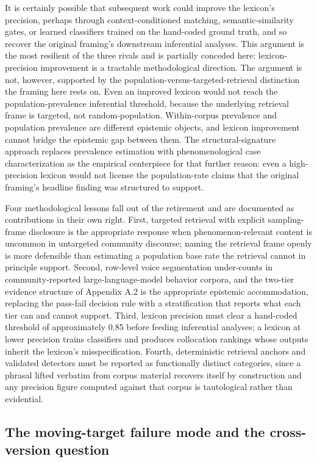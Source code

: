 \documentclass[11pt]{article}
\begin{document}
It is certainly possible that subsequent work could improve the lexicon's precision, perhaps through context-conditioned matching, semantic-similarity gates, or learned classifiers trained on the hand-coded ground truth, and so recover the original framing's downstream inferential analyses. This argument is the most resilient of the three rivals and is partially conceded here: lexicon-precision improvement is a tractable methodological direction. The argument is not, however, supported by the population-versus-targeted-retrieval distinction the framing here rests on. Even an improved lexicon would not reach the population-prevalence inferential threshold, because the underlying retrieval frame is targeted, not random-population. Within-corpus prevalence and population prevalence are different epistemic objects, and lexicon improvement cannot bridge the epistemic gap between them. The structural-signature approach replaces prevalence estimation with phenomenological case characterization as the empirical centerpiece for that further reason: even a high-precision lexicon would not license the population-rate claims that the original framing's headline finding was structured to support.

Four methodological lessons fall out of the retirement and are documented as contributions in their own right. First, targeted retrieval with explicit sampling-frame disclosure is the appropriate response when phenomenon-relevant content is uncommon in untargeted community discourse; naming the retrieval frame openly is more defensible than estimating a population base rate the retrieval cannot in principle support. Second, row-level voice segmentation under-counts in community-reported large-language-model behavior corpora, and the two-tier evidence structure of Appendix A.2 is the appropriate epistemic accommodation, replacing the pass-fail decision rule with a stratification that reports what each tier can and cannot support. Third, lexicon precision must clear a hand-coded threshold of approximately 0.85 before feeding inferential analyses; a lexicon at lower precision trains classifiers and produces collocation rankings whose outputs inherit the lexicon's misspecification. Fourth, deterministic retrieval anchors and validated detectors must be reported as functionally distinct categories, since a phrasal lifted verbatim from corpus material recovers itself by construction and any precision figure computed against that corpus is tautological rather than evidential.

\subsection{The moving-target failure mode and the cross-version question}
\end{document}
